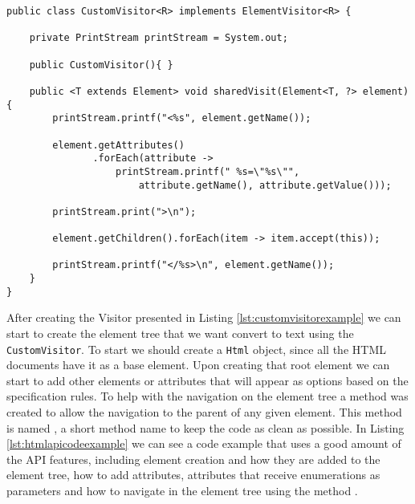 \begin{minipage}{\linewidth}
\begin{lstlisting}[caption={Custom Visitor},label={lst:customvisitorexample}]
public class CustomVisitor<R> implements ElementVisitor<R> {

    private PrintStream printStream = System.out;

    public CustomVisitor(){ }

    public <T extends Element> void sharedVisit(Element<T, ?> element) {
        printStream.printf("<%s", element.getName());

        element.getAttributes()
               .forEach(attribute -> 
                   printStream.printf(" %s=\"%s\"", 
                       attribute.getName(), attribute.getValue()));

        printStream.print(">\n");

        element.getChildren().forEach(item -> item.accept(this));

        printStream.printf("</%s>\n", element.getName());
    }
}
\end{lstlisting}
\end{minipage}

\noindent
After creating the Visitor presented in Listing \ref{lst:customvisitorexample} we can start to create the element tree that we want convert to text using the \texttt{CustomVisitor}. To start we should create a \texttt{Html} object, since all the \ac{HTML} documents have it as a base element. Upon creating that root element we can start to add other elements or attributes that will appear as options based on the specification rules. To help with the navigation on the element tree a method was created to allow the navigation to the parent of any given element. This method is named \texttt{\textdegree}, a short method name to keep the code as clean as possible. In Listing \ref{lst:htmlapicodeexample} we can see a code example that uses a good amount of the \ac{API} features, including element creation and how they are added to the element tree, how to add attributes, attributes that receive enumerations as parameters and how to navigate in the element tree using the method \texttt{\textdegree}.

\bigskip


